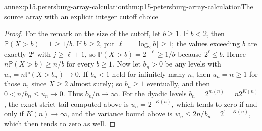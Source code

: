 \begin{annexitem}{annex:p15.petersburg-array-calculation}{thm:p15-petersburg-array-calculation}{The source array with an explicit integer cutoff choice}
\begin{proof}
For the remark on the size of the cutoff, let \(b\geq1\). If
\(b<2\), then \(\mathbb P(X>b)=1\geq1/b\). If \(b\geq2\), put
\(\ell=\lfloor\log_2b\rfloor\geq1\); the values exceeding \(b\) are
exactly \(2^j\) with \(j\geq\ell+1\), so
\(\mathbb P(X>b)=2^{-\ell}\geq1/b\) because \(2^\ell\leq b\).
Hence \(n\mathbb P(X>b)\geq n/b\) for every \(b\geq1\).
Now let \(b_n>0\) be any levels with \(u_n=n\mathbb P(X>b_n)\to0\).
If \(b_n<1\) held for infinitely many \(n\), then
\(u_n=n\geq1\) for those \(n\), since \(X\geq2\) almost surely; so
\(b_n\geq1\) eventually, and then \(0<n/b_n\leq u_n\to0\). Thus
\(b_n/n\to\infty\). For the dyadic levels \(b_n=2^{m(n)}=n2^{K(n)}\),
the exact strict tail computed above is \(u_n=2^{-K(n)}\), which tends
to zero if and only if \(K(n)\to\infty\), and the variance bound above
is \(w_n\leq2n/b_n=2^{1-K(n)}\), which then tends to zero as well.
\end{proof}
\end{annexitem}

